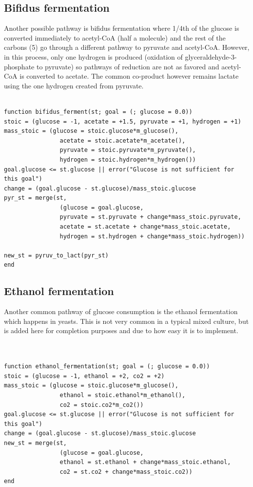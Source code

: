 \documentclass[11pt]{article}
\begin{document}
\subsection{Bifidus fermentation}
\label{sec:org23b3f41}
Another possible pathway is bifidus fermentation where 1/4th of the glucose is converted immediately to acetyl-CoA (half a molecule) and the rest of the carbons (5) go through a different pathway to pyruvate and acetyl-CoA. However, in this process, only one hydrogen is produced (oxidation of glyceraldehyde-3-phosphate to pyruvate) so pathways of reduction are not as favored and acetyl-CoA is converted to acetate. The common co-product however remains lactate using the one hydrogen created from pyruvate.

\begin{verbatim}

function bifidus_ferment(st; goal = (; glucose = 0.0))
stoic = (glucose = -1, acetate = +1.5, pyruvate = +1, hydrogen = +1)
mass_stoic = (glucose = stoic.glucose*m_glucose(),
                acetate = stoic.acetate*m_acetate(),
                pyruvate = stoic.pyruvate*m_pyruvate(),
                hydrogen = stoic.hydrogen*m_hydrogen())
goal.glucose <= st.glucose || error("Glucose is not sufficient for this goal")
change = (goal.glucose - st.glucose)/mass_stoic.glucose
pyr_st = merge(st,
                (glucose = goal.glucose,
                pyruvate = st.pyruvate + change*mass_stoic.pyruvate,
                acetate = st.acetate + change*mass_stoic.acetate,
                hydrogen = st.hydrogen + change*mass_stoic.hydrogen))

new_st = pyruv_to_lact(pyr_st)
end

\end{verbatim}

\subsection{Ethanol fermentation}
\label{sec:org513cc9d}
Another common pathway of glucose consumption is the ethanol fermentation which happens in yeasts. This is not very common in a typical mixed culture, but is added here for completion purposes and due to how easy it is to implement.

\begin{verbatim}


function ethanol_fermentation(st; goal = (; glucose = 0.0))
stoic = (glucose = -1, ethanol = +2, co2 = +2)
mass_stoic = (glucose = stoic.glucose*m_glucose(),
                ethanol = stoic.ethanol*m_ethanol(),
                co2 = stoic.co2*m_co2())
goal.glucose <= st.glucose || error("Glucose is not sufficient for this goal")
change = (goal.glucose - st.glucose)/mass_stoic.glucose
new_st = merge(st,
                (glucose = goal.glucose,
                ethanol = st.ethanol + change*mass_stoic.ethanol,
                co2 = st.co2 + change*mass_stoic.co2))
end

\end{verbatim}
\end{document}
